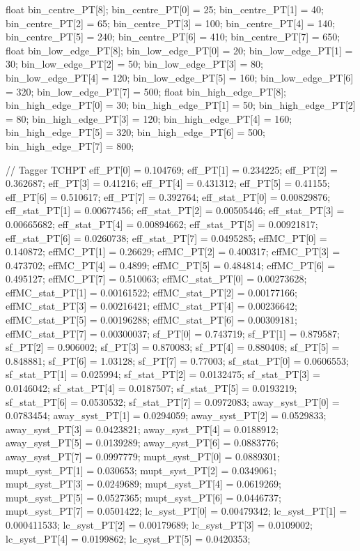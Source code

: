 float bin_centre_PT[8];
bin_centre_PT[0] = 25; bin_centre_PT[1] = 40; bin_centre_PT[2] = 65; 
bin_centre_PT[3] = 100; bin_centre_PT[4] = 140; bin_centre_PT[5] = 240; 
bin_centre_PT[6] = 410; bin_centre_PT[7] = 650; 
float bin_low_edge_PT[8];
bin_low_edge_PT[0] = 20; bin_low_edge_PT[1] = 30; bin_low_edge_PT[2] = 50; 
bin_low_edge_PT[3] = 80; bin_low_edge_PT[4] = 120; bin_low_edge_PT[5] = 160; 
bin_low_edge_PT[6] = 320; bin_low_edge_PT[7] = 500; 
float bin_high_edge_PT[8];
bin_high_edge_PT[0] = 30; bin_high_edge_PT[1] = 50; bin_high_edge_PT[2] = 80; 
bin_high_edge_PT[3] = 120; bin_high_edge_PT[4] = 160; bin_high_edge_PT[5] = 320; 
bin_high_edge_PT[6] = 500; bin_high_edge_PT[7] = 800; 


// Tagger TCHPT
eff_PT[0] = 0.104769; eff_PT[1] = 0.234225; eff_PT[2] = 0.362687; 
eff_PT[3] = 0.41216; eff_PT[4] = 0.431312; eff_PT[5] = 0.41155; 
eff_PT[6] = 0.510617; eff_PT[7] = 0.392764; 
eff_stat_PT[0] = 0.00829876; eff_stat_PT[1] = 0.00677456; eff_stat_PT[2] = 0.00505446; 
eff_stat_PT[3] = 0.00665682; eff_stat_PT[4] = 0.00894662; eff_stat_PT[5] = 0.00921817; 
eff_stat_PT[6] = 0.0260738; eff_stat_PT[7] = 0.0495285; 
effMC_PT[0] = 0.140872; effMC_PT[1] = 0.26629; effMC_PT[2] = 0.400317; 
effMC_PT[3] = 0.473702; effMC_PT[4] = 0.4899; effMC_PT[5] = 0.484814; 
effMC_PT[6] = 0.495127; effMC_PT[7] = 0.510063; 
effMC_stat_PT[0] = 0.00273628; effMC_stat_PT[1] = 0.00161522; effMC_stat_PT[2] = 0.00177166; 
effMC_stat_PT[3] = 0.00216421; effMC_stat_PT[4] = 0.00236642; effMC_stat_PT[5] = 0.00196288; 
effMC_stat_PT[6] = 0.00309181; effMC_stat_PT[7] = 0.00300037; 
sf_PT[0] = 0.743719; sf_PT[1] = 0.879587; sf_PT[2] = 0.906002; 
sf_PT[3] = 0.870083; sf_PT[4] = 0.880408; sf_PT[5] = 0.848881; 
sf_PT[6] = 1.03128; sf_PT[7] = 0.77003; 
sf_stat_PT[0] = 0.0606553; sf_stat_PT[1] = 0.025994; sf_stat_PT[2] = 0.0132475; 
sf_stat_PT[3] = 0.0146042; sf_stat_PT[4] = 0.0187507; sf_stat_PT[5] = 0.0193219; 
sf_stat_PT[6] = 0.0530532; sf_stat_PT[7] = 0.0972083; 
away_syst_PT[0] = 0.0783454; away_syst_PT[1] = 0.0294059; away_syst_PT[2] = 0.0529833; 
away_syst_PT[3] = 0.0423821; away_syst_PT[4] = 0.0188912; away_syst_PT[5] = 0.0139289; 
away_syst_PT[6] = 0.0883776; away_syst_PT[7] = 0.0997779; 
mupt_syst_PT[0] = 0.0889301; mupt_syst_PT[1] = 0.030653; mupt_syst_PT[2] = 0.0349061; 
mupt_syst_PT[3] = 0.0249689; mupt_syst_PT[4] = 0.0619269; mupt_syst_PT[5] = 0.0527365; 
mupt_syst_PT[6] = 0.0446737; mupt_syst_PT[7] = 0.0501422; 
lc_syst_PT[0] = 0.00479342; lc_syst_PT[1] = 0.000411533; lc_syst_PT[2] = 0.00179689; 
lc_syst_PT[3] = 0.0109002; lc_syst_PT[4] = 0.0199862; lc_syst_PT[5] = 0.0420353; 
